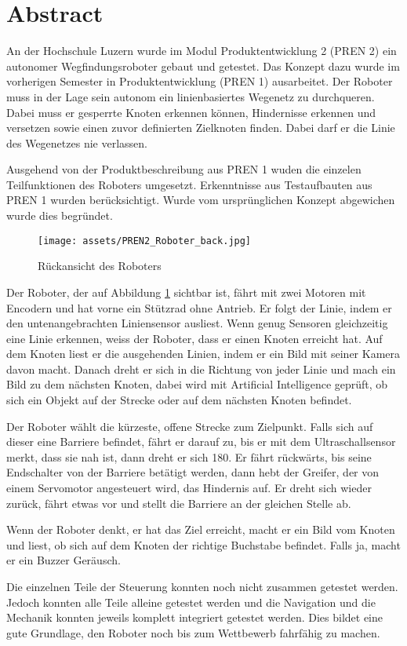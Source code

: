\section*{Abstract}


An der Hochschule Luzern wurde im Modul Produktentwicklung 2 (PREN 2) ein autonomer Wegfindungsroboter gebaut und getestet. Das Konzept dazu wurde im vorherigen Semester in Produktentwicklung (PREN 1) ausarbeitet. Der Roboter muss in der Lage sein autonom ein linienbasiertes Wegenetz zu durchqueren. Dabei muss er gesperrte Knoten erkennen können, Hindernisse erkennen und versetzen sowie einen zuvor definierten Zielknoten finden. Dabei darf er die Linie des Wegenetzes nie verlassen.


Ausgehend von der Produktbeschreibung aus PREN 1 wuden die einzelen Teilfunktionen des Roboters umgesetzt. Erkenntnisse aus Testaufbauten aus PREN 1 wurden berücksichtigt. Wurde vom ursprünglichen Konzept abgewichen wurde dies begründet. 

\begin{figure}[H]
    \centering
    \texttt{[image: assets/PREN2\_Roboter\_back.jpg]}
    \caption{Rückansicht des Roboters}
    \label{fig:roboter_back}
\end{figure}


Der Roboter, der auf Abbildung \ref{fig:roboter_back} sichtbar ist, fährt mit zwei Motoren mit Encodern und hat vorne ein Stützrad ohne Antrieb. Er folgt der Linie, indem er den untenangebrachten Liniensensor ausliest. Wenn genug Sensoren gleichzeitig eine Linie erkennen, weiss der Roboter, dass er einen Knoten erreicht hat. Auf dem Knoten liest er die ausgehenden Linien, indem er ein Bild mit seiner Kamera davon macht. Danach dreht er sich in die Richtung von jeder Linie und mach ein Bild zu dem nächsten Knoten, dabei wird mit Artificial Intelligence geprüft, ob sich ein Objekt auf der Strecke oder auf dem nächsten Knoten befindet.

Der Roboter wählt die kürzeste, offene Strecke zum Zielpunkt. Falls sich auf dieser eine Barriere befindet, fährt er darauf zu, bis er mit dem Ultraschallsensor merkt, dass sie nah ist, dann dreht er sich 180\textdegree. Er fährt rückwärts, bis seine Endschalter von der Barriere betätigt werden, dann hebt der Greifer, der von einem Servomotor angesteuert wird, das Hindernis auf. Er dreht sich wieder zurück, fährt etwas vor und stellt die Barriere an der gleichen Stelle ab.

Wenn der Roboter denkt, er hat das Ziel erreicht, macht er ein Bild vom Knoten und liest, ob sich auf dem Knoten der richtige Buchstabe befindet. Falls ja, macht er ein Buzzer Geräusch.


Die einzelnen Teile der Steuerung konnten noch nicht zusammen getestet werden. Jedoch konnten alle Teile alleine getestet werden und die Navigation und die Mechanik konnten jeweils komplett integriert getestet werden. Dies bildet eine gute Grundlage, den Roboter noch bis zum Wettbewerb fahrfähig zu machen.
